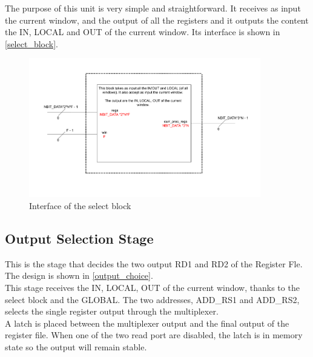 The purpose of this unit is very simple and straightforward. It receives as input the current window, and the output of all the registers and it outputs the content the IN, LOCAL and OUT of the current window. Its interface is shown in \autoref{select_block}.

\begin{figure}[ht]
  \centering
  \includegraphics[width=0.9\textwidth]{chapters/4_DecodeStage/images/select_block.pdf}
  \caption{Interface of the select block}
  \label{select_block}
\end{figure}

\subsection{Output Selection Stage}
This is the stage that decides the two output RD1 and RD2 of the Register Fle. The design is shown in \autoref{output_choice}.\\

This stage receives the IN, LOCAL, OUT of the current window, thanks to the select block and the GLOBAL. The two addresses, ADD\_RS1 and ADD\_RS2, selects the single register output through the multiplexer.\\

A latch is placed between the multiplexer output and the final output of the register file. When one of the two read port are disabled, the latch is in memory state so the output will remain stable.

